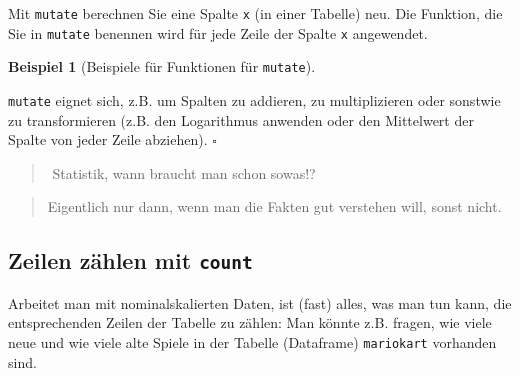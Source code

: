 \documentclass[
  letterpaper,
]{scrbook}
\theoremstyle{definition}
\newtheorem{example}{Beispiel}[chapter]
\theoremstyle{definition}
\theoremstyle{definition}
\theoremstyle{remark}
\begin{document}
Mit \texttt{mutate} berechnen Sie eine Spalte \texttt{x} (in einer
Tabelle) neu. Die Funktion, die Sie in \texttt{mutate} benennen wird für
jede Zeile der Spalte \texttt{x} angewendet.

\begin{example}[Beispiele für Funktionen für
\texttt{mutate}]\protect\hypertarget{exm-mutate2}{}\label{exm-mutate2}

\texttt{mutate} eignet sich, z.B. um Spalten zu addieren, zu
multiplizieren oder sonstwie zu transformieren (z.B. den Logarithmus
anwenden oder den Mittelwert der Spalte von jeder Zeile abziehen).
\(\square\)

\end{example}

\begin{quote}
{}️ Statistik, wann braucht man schon sowas!?
\end{quote}

\begin{quote}
{} Eigentlich nur dann, wenn man die Fakten gut verstehen
will, sonst nicht.
\end{quote}

\subsection{\texorpdfstring{Zeilen zählen mit
\texttt{count}}{Zeilen zählen mit count}}\label{zeilen-zuxe4hlen-mit-count}

Arbeitet man mit nominalskalierten Daten, ist (fast) alles, was man tun
kann, die entsprechenden Zeilen der Tabelle zu zählen: Man könnte z.B.
fragen, wie viele neue und wie viele alte Spiele in der Tabelle
(Dataframe) \texttt{mariokart} vorhanden sind.
\end{document}
